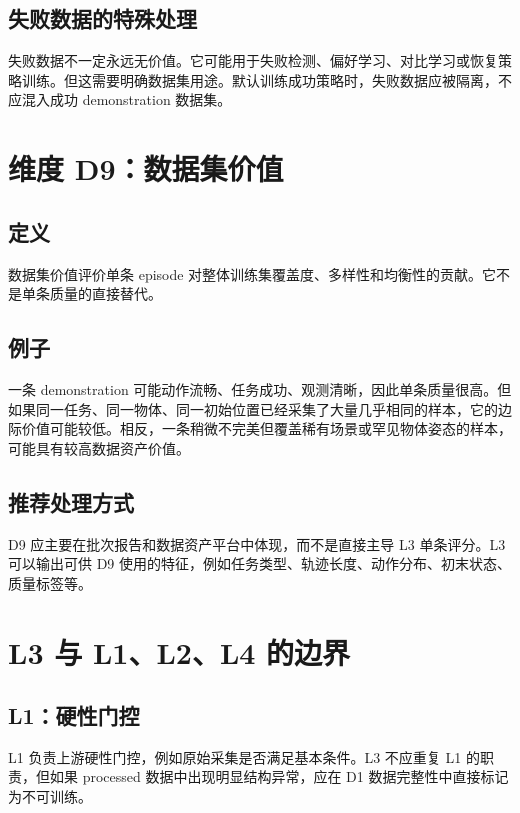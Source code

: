 \documentclass[UTF8,zihao=-4,oneside,openany]{ctexrep}
\begin{document}
\subsection{失败数据的特殊处理}

失败数据不一定永远无价值。它可能用于失败检测、偏好学习、对比学习或恢复策略训练。但这需要明确数据集用途。默认训练成功策略时，失败数据应被隔离，不应混入成功 demonstration 数据集。

\section{维度 D9：数据集价值}

\subsection{定义}

数据集价值评价单条 episode 对整体训练集覆盖度、多样性和均衡性的贡献。它不是单条质量的直接替代。

\subsection{例子}

一条 demonstration 可能动作流畅、任务成功、观测清晰，因此单条质量很高。但如果同一任务、同一物体、同一初始位置已经采集了大量几乎相同的样本，它的边际价值可能较低。相反，一条稍微不完美但覆盖稀有场景或罕见物体姿态的样本，可能具有较高数据资产价值。

\subsection{推荐处理方式}

D9 应主要在批次报告和数据资产平台中体现，而不是直接主导 L3 单条评分。L3 可以输出可供 D9 使用的特征，例如任务类型、轨迹长度、动作分布、初末状态、质量标签等。

\section{L3 与 L1、L2、L4 的边界}

\subsection{L1：硬性门控}

L1 负责上游硬性门控，例如原始采集是否满足基本条件。L3 不应重复 L1 的职责，但如果 processed 数据中出现明显结构异常，应在 D1 数据完整性中直接标记为不可训练。
\end{document}
